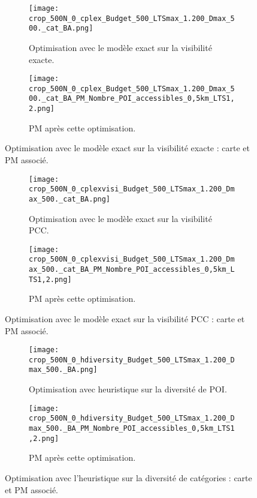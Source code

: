 \begin{figure}[H]
    \centering
    \begin{subfigure}[t]{0.45\textwidth}
        \centering
        \texttt{[image: crop\_500N\_0\_cplex\_Budget\_500\_LTSmax\_1.200\_Dmax\_500.\_cat\_BA.png]}
        \caption{Optimisation avec le modèle exact sur la visibilité exacte.}
    \end{subfigure}
    \hfill
    \begin{subfigure}[t]{0.45\textwidth}
        \centering
        \texttt{[image: crop\_500N\_0\_cplex\_Budget\_500\_LTSmax\_1.200\_Dmax\_500.\_cat\_BA\_PM\_Nombre\_POI\_accessibles\_0,5km\_LTS1,2.png]}
        \caption{PM après cette optimisation.}
    \end{subfigure}
    \caption{Optimisation avec le modèle exact sur la visibilité exacte : carte et PM associé.}
    \label{fig:carteexacte}
\end{figure}

\begin{figure}[H]
    \centering
    \begin{subfigure}[t]{0.45\textwidth}
        \centering
        \texttt{[image: crop\_500N\_0\_cplexvisi\_Budget\_500\_LTSmax\_1.200\_Dmax\_500.\_cat\_BA.png]}
        \caption{Optimisation avec le modèle exact sur la visibilité PCC.}
    \end{subfigure}
    \hfill
    \begin{subfigure}[t]{0.45\textwidth}
        \centering
        \texttt{[image: crop\_500N\_0\_cplexvisi\_Budget\_500\_LTSmax\_1.200\_Dmax\_500.\_cat\_BA\_PM\_Nombre\_POI\_accessibles\_0,5km\_LTS1,2.png]}
        \caption{PM après cette optimisation.}
    \end{subfigure}
    \caption{Optimisation avec le modèle exact sur la visibilité PCC : carte et PM associé.}
    \label{fig:cartepcc}
\end{figure}

\begin{figure}[H]
    \centering
    \begin{subfigure}[t]{0.45\textwidth}
        \centering
        \texttt{[image: crop\_500N\_0\_hdiversity\_Budget\_500\_LTSmax\_1.200\_Dmax\_500.\_BA.png]}
        \caption{Optimisation avec heuristique sur la diversité de POI.}
    \end{subfigure}
    \hfill
    \begin{subfigure}[t]{0.45\textwidth}
        \centering
        \texttt{[image: crop\_500N\_0\_hdiversity\_Budget\_500\_LTSmax\_1.200\_Dmax\_500.\_BA\_PM\_Nombre\_POI\_accessibles\_0,5km\_LTS1,2.png]}
        \caption{PM après cette optimisation.}
    \end{subfigure}
    \caption{Optimisation avec l'heuristique sur la diversité de catégories : carte et PM associé.}
    \label{fig:carteheuristique}
\end{figure}


